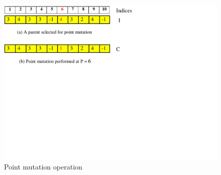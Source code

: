 \begin{figure}[!htb]
\hspace{35mm}
\includegraphics [scale=0.85]{figures/mute.pdf}
\vspace{-75mm}
\caption{Point mutation operation}
\label{mute}
\end{figure}

